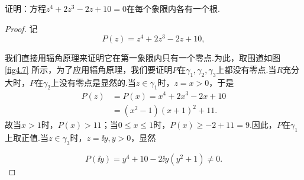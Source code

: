 \begin{example}\label{exam4.4.14}
  证明：方程$z^4+2z^3-2z+10=0$在每个象限内各有一个根.
\end{example}
\begin{proof}
  记
  \[
    P(z) = z^4 + 2z^3 - 2z + 10,
  \]
  \begin{minipage}{0.7\textwidth}
    我们直接用辐角原理来证明它在第一象限内只有一个零点.为此，取围道如图 \ref{fig4.7} 所示，为了应用辐角原理，我们要证明$P$在$\gamma_1,\gamma_2,\gamma_3$上都没有零点.当$R$充分大时，$P$在$\gamma_2$上没有零点是显然的.当$z\in\gamma_1$时，$z=x>0$，于是
    \begin{align*}
      P(z) & = P(x) = x^4 + 2x^3 - 2x + 10\\
           & = (x^2 - 1)( x + 1)^2 + 11.
    \end{align*}
    故当$x>1$时，$P(x)>11$；当$0\le x\le1$时，$P(x)\ge-2+11=9$.因此，$P$在$\gamma_1$上取正值.当$z\in \gamma_3$时，$z=\ii y,y>0$，显然
  \end{minipage}
  \begin{minipage}{0.3\textwidth}
    \centering
  \end{minipage}
  \[
    P(\ii y) = y^4 + 10 - 2\ii y(y^2+1)\ne0.
  \]


\end{proof}
